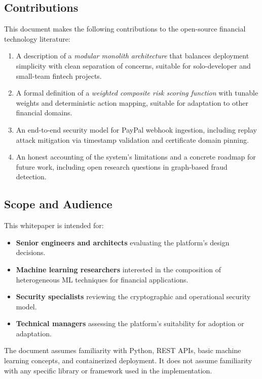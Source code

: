 \documentclass[11pt,a4paper]{article}
\begin{document}
\subsection{Contributions}

This document makes the following contributions to the open-source financial technology literature:

\begin{contributionbox}
\begin{enumerate}
  \item A description of a \emph{modular monolith architecture} that balances deployment simplicity with clean separation of concerns, suitable for solo-developer and small-team fintech projects.
  \item A formal definition of a \emph{weighted composite risk scoring function} with tunable weights and deterministic action mapping, suitable for adaptation to other financial domains.
  \item An end-to-end security model for PayPal webhook ingestion, including replay attack mitigation via timestamp validation and certificate domain pinning.
  \item An honest accounting of the system's limitations and a concrete roadmap for future work, including open research questions in graph-based fraud detection.
\end{enumerate}
\end{contributionbox}

\subsection{Scope and Audience}

This whitepaper is intended for:
\begin{itemize}[leftmargin=*]
  \item \textbf{Senior engineers and architects} evaluating the platform's design decisions.
  \item \textbf{Machine learning researchers} interested in the composition of heterogeneous ML techniques for financial applications.
  \item \textbf{Security specialists} reviewing the cryptographic and operational security model.
  \item \textbf{Technical managers} assessing the platform's suitability for adoption or adaptation.
\end{itemize}

The document assumes familiarity with Python, REST APIs, basic machine learning concepts, and containerized deployment. It does not assume familiarity with any specific library or framework used in the implementation.
\end{document}
